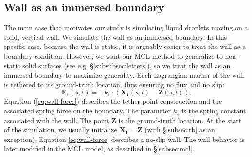 \documentclass{jfm}
\begin{document}
\subsection{Wall as an immersed boundary} \label{subsec:wall}
The main case that motivates our study is simulating liquid droplets moving on a solid, vertical wall. We simulate the wall as an immersed boundary. In this specific case, because the wall is static, it is arguably easier to treat the wall as a boundary condition. However, we want our MCL method to generalize to non-static solid surfaces (see e.g. \S\ref{subsubsec:letters}), so we treat the wall as an immersed boundary to maximize generality. Each Lagrangian marker of the wall is tethered to its ground-truth location, thus ensuring no flux and no slip: 
\begin{equation}
\bm{F}_1(s,t) = -k_1 \cdot (
    \bm{X}_1(s,t) - \bm{Z}(s,t)
). \label{eq:wall-force}
\end{equation}
Equation (\ref{eq:wall-force}) describes the tether-point construction and the associated spring force on the boundary. The parameter $k_1$ is the spring constant associated with the wall. The point $\boldsymbol{Z}$ is the ground-truth location. At the start of the simulation, we usually initialize $\boldsymbol{X_1} = \boldsymbol{Z}$ (with \S\ref{subsec:rb} as an exception). Equation \eqref{eq:wall-force} describes a no-slip wall. The wall behavior is later modified in the MCL model, as described in \S\ref{subsec:mcl}. 
\end{document}
